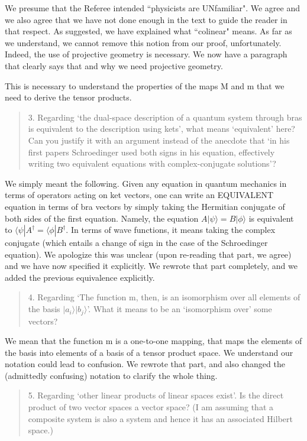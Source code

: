 \documentclass[11pt]{article}
\def\>{\rangle}
\def\<{\langle}
\begin{document}
We presume that the Referee intended ``physicists are UNfamiliar".  We
agree and we also agree that we have not done enough in the text to
guide the reader in that respect. As suggested, we have explained what
``colinear" means. As far as we understand, we cannot remove this
notion from our proof, unfortunately. Indeed, the use of projective
geometry is necessary. We now have a paragraph that clearly says that
and why we need projective geometry.

This is necessary to understand the properties of the maps M and m
that we need to derive the tensor products.

\begin{quote}
3. Regarding `the dual-space description of a quantum
system through bras is equivalent to the description using kets', what
means `equivalent' here? Can you justify it with an argument instead
of the anecdote that `in his first papers Schroedinger used both signs
in his equation, effectively writing two equivalent equations with
complex-conjugate solutions'?
\end{quote}

We simply meant the following. Given any equation in quantum mechanics
in terms of operators acting on ket vectors, one can write an
EQUIVALENT equation in terms of bra vectors by simply taking the
Hermitian conjugate of both sides of the first equation. Namely, the
equation $A|\psi\>=B|\phi\>$ is equivalent to $\<\psi|A^\dag=\<\phi|B^\dag$. In
terms of wave functions, it means taking the complex conjugate (which
entails a change of sign in the case of the Schroedinger equation). We
apologize this was unclear (upon re-reading that part, we agree) and
we have now specified it explicitly. We rewrote that part completely,
and we added the previous equivalence explicitly.

\begin{quote}
4. Regarding `The function m, then, is an isomorphism over
all elements of the basis $|a_i\>|b_j\>$'. What it means to be an
`isomorphism over' some vectors?
\end{quote}

We mean that the function m is a one-to-one mapping, that maps the
elements of the basis into elements of a basis of a tensor product
space. We understand our notation could lead to confusion. We rewrote that part, and also changed the (admittedly confusing)
notation to clarify the whole thing.

\begin{quote}
5. Regarding `other linear products of linear spaces
exist'. Is the direct product of two vector spaces a vector space? (I
am assuming that a composite system is also a system and hence it has
an associated Hilbert space.)
\end{quote}
\end{document}
